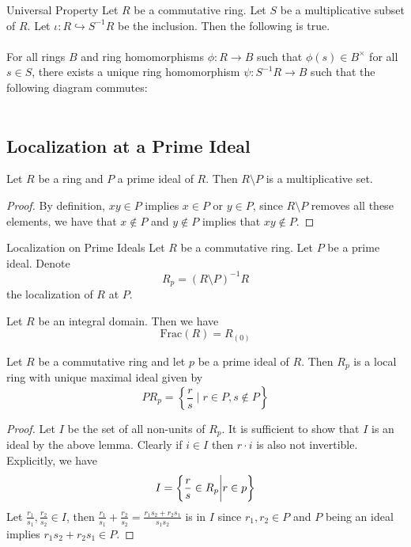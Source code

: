 \documentclass[a4paper]{article}
\begin{document}
\begin{prp}{Universal Property}{} Let $R$ be a commutative ring. Let $S$ be a multiplicative subset of $R$. Let $\iota:R\hookrightarrow S^{-1}R$ be the inclusion. Then the following is true. \\~\\

For all rings $B$ and ring homomorphisms $\phi:R\to B$ such that $\phi(s)\in B^\times$ for all $s\in S$, there exists a unique ring homomorphism $\psi:S^{-1}R\to B$ such that the following diagram commutes: \\~\\
\end{prp}

\subsection{Localization at a Prime Ideal}
\begin{lmm}{}{} Let $R$ be a ring and $P$ a prime ideal of $R$. Then $R\setminus P$ is a multiplicative set. \tcbline
\begin{proof}
By definition, $xy\in P$ implies $x\in P$ or $y\in P$, since $R\setminus P$ removes all these elements, we have that $x\notin P$ and $y\notin P$ implies that $xy\notin P$. 
\end{proof}
\end{lmm}

\begin{defn}{Localization on Prime Ideals}{} Let $R$ be a commutative ring. Let $P$ be a prime ideal. Denote $$R_p=(R\setminus P)^{-1}R$$ the localization of $R$ at $P$. 
\end{defn}

\begin{lmm}{}{} Let $R$ be an integral domain. Then we have $$\text{Frac}(R)=R_{(0)}$$
\end{lmm}

\begin{prp}{}{} Let $R$ be a commutative ring and let $p$ be a prime ideal of $R$. Then $R_p$ is a local ring with unique maximal ideal given by $$PR_p=\left\{\frac{r}{s}\;|\;r\in P,s\notin P\right\}$$ \tcbline
\begin{proof}
Let $I$ be the set of all non-units of $R_p$. It is sufficient to show that $I$ is an ideal by the above lemma. Clearly if $i\in I$ then $r\cdot i$ is also not invertible. Explicitly, we have $$I=\left\{\frac{r}{s}\in R_p\bigg{|}r\in p\right\}$$ Let $\frac{r_1}{s_1},\frac{r_2}{s_2}\in I$, then $\frac{r_1}{s_1}+\frac{r_2}{s_2}=\frac{r_1s_2+r_2s_1}{s_1s_2}$ is in $I$ since $r_1,r_2\in P$ and $P$ being an ideal implies $r_1s_2+r_2s_1\in P$. 
\end{proof}
\end{prp}
\end{document}
